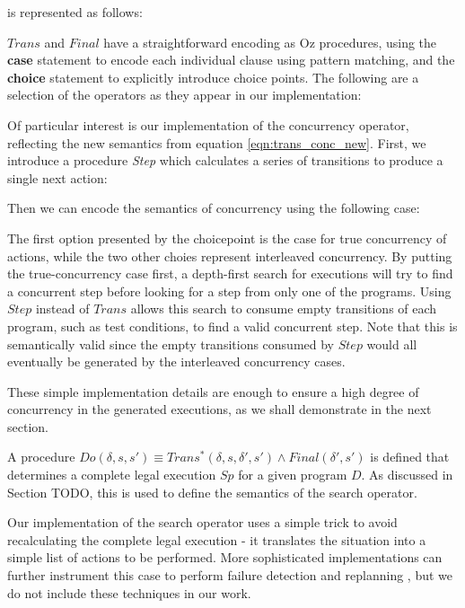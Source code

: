 is represented as follows:


$Trans$ and $Final$ have a straightforward encoding as Oz procedures,
using the \textbf{case} statement to encode each individual clause
using pattern matching, and the \textbf{choice} statement to explicitly
introduce choice points. The following are a selection of the operators
as they appear in our implementation:



Of particular interest is our implementation of the concurrency operator,
reflecting the new semantics from equation \eqref{eqn:trans_conc_new}.
First, we introduce a procedure \emph{Step} which calculates a series
of transitions to produce a single next action:


Then we can encode the semantics of concurrency using the following
case:


The first option presented by the choicepoint is the case for true
concurrency of actions, while the two other choies represent interleaved
concurrency. By putting the true-concurrency case first, a depth-first
search for executions will try to find a concurrent step before looking
for a step from only one of the programs. Using $Step$ instead of
$Trans$ allows this search to consume empty transitions of each program,
such as test conditions, to find a valid concurrent step. Note that
this is semantically valid since the empty transitions consumed by
$Step$ would all eventually be generated by the interleaved concurrency
cases.

These simple implementation details are enough to ensure a high degree
of concurrency in the generated executions, as we shall demonstrate
in the next section.

A procedure $Do(\delta,s,s')\equiv Trans^{*}(\delta,s,\delta',s')\wedge Final(\delta',s')$
is defined that determines a complete legal execution $Sp$ for a
given program $D$. As discussed in Section TODO, this is used to
define the semantics of the search operator.


Our implementation of the search operator uses a simple trick to avoid
recalculating the complete legal execution - it translates the situation
into a simple list of actions to be performed. More sophisticated
implementations can further instrument this case to perform failure
detection and replanning \citep{Lesperance00improved_indigolog},
but we do not include these techniques in our work.

